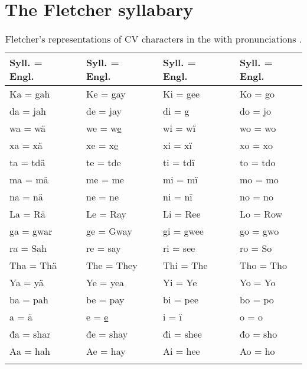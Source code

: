 \documentclass[output=paper]{LSP/langsci}
\begin{document}
				
\section{The Fletcher syllabary}

\begin{table}
\begin{tabular}{lllllll}
\lsptoprule
Syll. = Engl. && Syll. = Engl. && Syll. = Engl. && Syll. = Engl.\\
\midrule
Ka = gah && Ke = gay && Ki = gee && Ko = go\\
da = jah && de = jay && di = g && do = jo\\
wa = wä && we = w\underline{e} && wi = wï && wo = wo\\
xa = xä && xe = x\underline{e} && xi = xï && xo = xo\\
ta = tdä && te = tde && ti = tdï && to = tdo\\
ma = mä && me = me && mi = mï && mo = mo\\
na = nä && ne = ne && ni = nï && no = no\\
La = Rä && Le = Ray && Li = Ree && Lo = Row\\
ga = gwar && ge = Gway && gi = gwee && go = gwo\\
ra = Sah && re = say && ri = see && ro = So\\
Tha = Thä && The = They && Thi = The && Tho = Tho\\
Ya = yä && Ye = yea && Yi = Ye && Yo = Yo\\
ba = pah && be = pay && bi = pee && bo = po\\
a = ä && e = \underline{e} && i = ï && o = o\\
đa = shar && đe = shay && đi = shee && đo = sho\\
Aa = hah && Ae = hay && Ai = hee && Ao = ho\\
\lspbottomrule
\end{tabular}
\caption{Fletcher's representations of CV characters in the   with  pronunciations \citep[adapted from][300]{Fletcher1890a}.}
\label{fletchercv}
\end{table}
\end{document}
